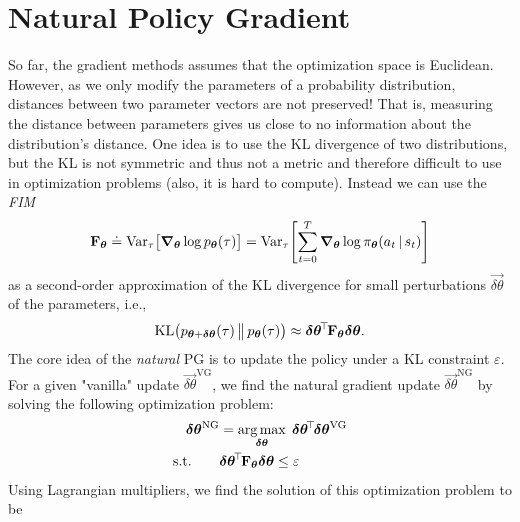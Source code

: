 	\section{Natural Policy Gradient}
		So far, the gradient methods assumes that the optimization space is Euclidean. However, as we only modify the parameters of a probability distribution, distances between two parameter vectors are not preserved! That is, measuring the distance between parameters gives us close to no information about the distribution's distance. One idea is to use the \ac{KL} divergence of two distributions, but the \ac{KL} is not symmetric and thus not a metric and therefore difficult to use in optimization problems (also, it is hard to compute). Instead we can use the \emph{\ac{FIM}}
		\begin{equation}
			\bm{\mathrm{F}}_{\bm{\theta}}
			\doteq \operatorname{Var}_\tau\bigl[ \grad_{\bm{\theta}} \log p_{\bm{\theta}}(\tau) \bigr]
			= \operatorname{Var}_\tau\Biggl[ \sum_{t = 0}^{T} \grad_{\bm{\theta}} \log \pi_{\bm{\theta}}(a_t \,\vert\, s_t) \Biggr]
		\end{equation}
		as a second-order approximation of the \ac{KL} divergence for small perturbations \(\vec{\delta\theta}\) of the parameters, i.e.,
		\begin{equation}
			\operatorname{KL}\bigl( p_{\bm{\theta} + \bm{\delta\theta}}(\tau) \,\big\Vert\, p_{\bm{\theta}}(\tau) \bigr) \approx \bm{\delta\theta}^{\!\top\!} \bm{\mathrm{F}}_{\bm{\theta}} \bm{\delta\theta}.
		\end{equation}
		The core idea of the \emph{natural} \ac{PG} is to update the policy under a \ac{KL} constraint \(\varepsilon\). For a given "vanilla" update \( \vec{\delta\theta}^\mathrm{VG} \), we find the natural gradient update \( \vec{\delta\theta}^\mathrm{NG} \) by solving the following optimization problem:
		\begin{equation}
			\begin{aligned}
				\bm{\delta\theta}^\mathrm{NG} & = \operatorname*{arg\,max}_{\bm{\delta\theta}} \; \bm{\delta\theta}^{\!\top\!} \bm{\delta\theta}^\mathrm{VG} \\
				\text{s.t.}\qquad              &
				\begin{aligned}[t]
					\bm{\delta\theta}^{\!\top\!} \bm{\mathrm{F}}_{\bm{\theta}} \bm{\delta\theta} & \leq \varepsilon
				\end{aligned}
			\end{aligned}
			\label{eq:ngOptProblem}
		\end{equation}
		Using Lagrangian multipliers, we find the solution of this optimization problem to be
